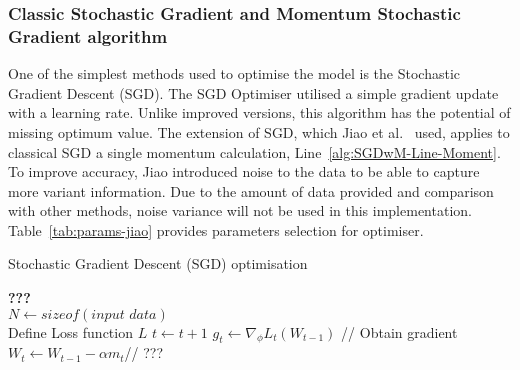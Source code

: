 \subsubsection{Classic Stochastic Gradient and Momentum Stochastic Gradient algorithm}
One of the simplest methods used to optimise the model is the Stochastic Gradient Descent (SGD).
The SGD Optimiser utilised a simple gradient update with a learning rate.
Unlike improved versions, this algorithm has the potential of missing optimum value. The extension of SGD, which Jiao et al.~\cite{jiao_gru-rnn_2020} used, applies to classical SGD a single momentum calculation, Line~\ref{alg:SGDwM-Line-Moment}.
To improve accuracy, Jiao introduced noise to the data to be able to capture more variant information.
Due to the amount of data provided and comparison with other methods, noise variance will not be used in this implementation.
Table~\ref{tab:params-jiao} provides parameters selection for optimiser.
\vspace{1pt}
\hspace{-3pt}
\begin{algorithm}
  \caption{Stochastic Gradient Descent (SGD) optimisation}
  \begin{algorithmic}[1]
    \STATE \textbf{???} \\ $N\gets sizeof(\textit{input data})$\\
    \STATE Define Loss function $L$
    \STATE $t \gets t+1$
    \STATE $g_t \gets \nabla_\phi L_t (W_{t-1})$ // Obtain gradient
    \STATE $W_t \gets W_{t-1} - \alpha m_t $// ???
    \ENDWHILE
  \end{algorithmic}
  \label{alg:SGD}
\end{algorithm}


